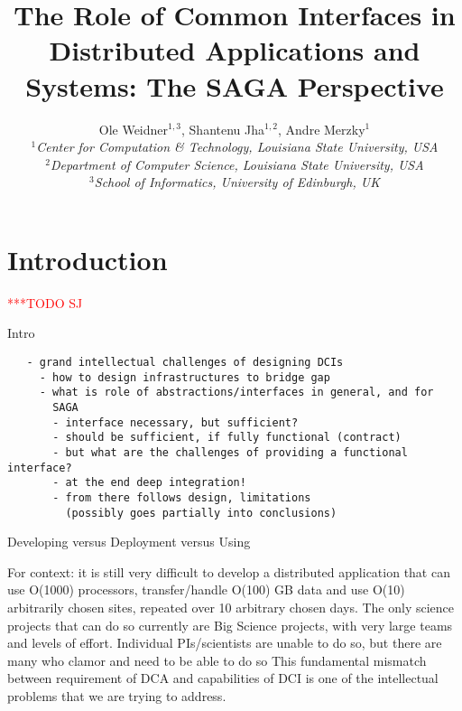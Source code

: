 \documentclass[a4paper,10pt]{article}
\newcommand{\todo}[1]{     {\textcolor{red}  { ***TODO      #1 }}}
\newcommand{\todo}[1]{}
\begin{document}
 \title{ \large \vspace{-3.5em} The Role of Common Interfaces in
   Distributed Applications and Systems: The SAGA Perspective}


 \author{\normalsize Ole Weidner$^{1,3}$, Shantenu Jha$^{1,2}$, Andre Merzky$^{1}$\\
   \small{\emph{$^{1}$Center for Computation \& Technology, Louisiana State University, USA}}\\
   \small{\emph{$^{2}$Department of Computer Science, Louisiana State University, USA}}\\
   \small{\emph{$^{3}$School of Informatics, University of Edinburgh, UK}}
 }
 \date{}
 \maketitle

 
\section{Introduction}
 \todo{SJ}
 \label{intro}

  Intro

 \begin{verbatim}
   - grand intellectual challenges of designing DCIs
     - how to design infrastructures to bridge gap
     - what is role of abstractions/interfaces in general, and for
       SAGA
       - interface necessary, but sufficient?
       - should be sufficient, if fully functional (contract)
       - but what are the challenges of providing a functional interface?
       - at the end deep integration!
       - from there follows design, limitations
         (possibly goes partially into conclusions)
 \end{verbatim}

Developing versus Deployment versus Using

For context: it is still very difficult to develop a distributed
application that can use O(1000) processors, transfer/handle O(100) GB
data and use O(10) arbitrarily chosen sites, repeated over 10
arbitrary chosen days. The only science projects that can do so
currently are Big Science projects, with very large teams and levels
of effort.  Individual PIs/scientists are unable to do so, but there
are many who clamor and need to be able to do so This fundamental
mismatch between requirement of DCA and capabilities of DCI is one of
the intellectual problems that we are trying to address.
\end{document}

